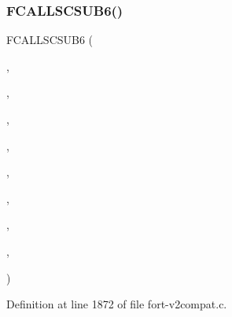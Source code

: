 \subsubsection{\texorpdfstring{F\+C\+A\+L\+L\+S\+C\+S\+U\+B6()}{FCALLSCSUB6()}\hspace{0.1cm}{\footnotesize\ttfamily [6/6]}}
{\footnotesize\ttfamily F\+C\+A\+L\+L\+S\+C\+S\+U\+B6 (\begin{DoxyParamCaption}\item[{\hyperlink{nf__v2compat_8c_a3130c6d2dee74a8b7bdfc7dc72e5bdf4}{c\+\_\+ncacpy}}]{,  }\item[{N\+C\+A\+C\+PY}]{,  }\item[{\hyperlink{nf__fortv2_8f90_a251a629393e35281e714774eddea2551}{ncacpy}}]{,  }\item[{\hyperlink{ncfortran_8h_a77bc5b6e6321a310e41121867f2e999e}{N\+C\+I\+D1}}]{,  }\item[{V\+A\+R\+I\+D1}]{,  }\item[{S\+T\+R\+I\+NG}]{,  }\item[{\hyperlink{ncfortran_8h_afc3f5dd7cd297678e0066bb7e2d3fcb4}{N\+C\+I\+D2}}]{,  }\item[{V\+A\+R\+I\+D2}]{,  }\item[{\hyperlink{fort-v2compat_8c_ae2352f39cbd25bcaf1bedbbb12db73fe}{P\+R\+C\+O\+DE}}]{ }\end{DoxyParamCaption})}



Definition at line 1872 of file fort-\/v2compat.\+c.

\mbox{\label{fort-v2compat_8c_ad88c75187e19db15b1e57408f25ff0db}} 

